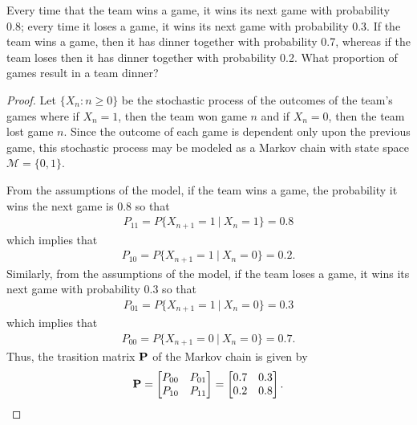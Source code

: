 \begin{problem}{4.28}
  Every time that the team wins a game, it wins its next game with probability 0.8;
  every time it loses a game, it wins its next game with probability 0.3. If the
  team wins a game, then it has dinner together with probability 0.7, whereas
  if the team loses then it has dinner together with probability 0.2. What
  proportion of games result in a team dinner?
\end{problem}

\begin{proof}
  Let $\{X_n: n\geq 0\}$ be the stochastic process of the outcomes of the team's games
  where if $X_n = 1$, then the team won game $n$ and if $X_n = 0$, then the team lost game $n$.
  Since the outcome of each game is dependent only upon the previous game, this stochastic
  process may be modeled as a Markov chain with state space $\mathcal{M} = \{0, 1\}$.

  From the assumptions of the model, if the team wins a game, the probability
  it wins the next game is 0.8 so that
  \begin{align*}
    P_{11} = P\{X_{n+1} = 1\ |\ X_n = 1\} = 0.8
  \end{align*}
  which implies that
  \begin{align*}
    P_{10} = P\{X_{n+1} = 1\ |\ X_n = 0\} = 0.2.
  \end{align*}
  Similarly, from the assumptions of the model, if the team loses a game, it wins
  its next game with probability 0.3 so that
  \begin{align*}
    P_{01} = P\{X_{n+1} = 1\ |\ X_n = 0\} = 0.3
  \end{align*}
  which implies that
  \begin{align*}
    P_{00} = P\{X_{n+1} = 0\ |\ X_n = 0\} = 0.7.
  \end{align*}
  Thus, the trasition matrix $\bold{P}$ of the Markov chain is given by
  \begin{align*}
    \bold{P} =
    \begin{bmatrix}
      P_{00} & P_{01} \\
      P_{10} & P_{11}
    \end{bmatrix}
    =
    \begin{bmatrix}
      0.7 & 0.3 \\
      0.2 & 0.8
    \end{bmatrix}.
  \end{align*}


\end{proof}
